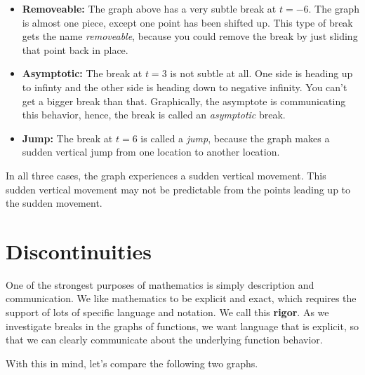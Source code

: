 \documentclass{ximera}
\begin{document}
\begin{itemize}
\item \textbf{\textcolor{blue!75!black}{Removeable:}}  The graph above has a very subtle break at $t=-6$. The graph is almost one piece, except one point has been shifted up. This type of break gets the name \textit{removeable}, because you could remove the break by just sliding that point back in place. \\

\item \textbf{\textcolor{blue!75!black}{Asymptotic:}} The break at $t=3$ is not subtle at all.  One side is heading up to infinty and the other side is heading down to negative infinity.  You can't get a bigger break than that. Graphically, the asymptote is communicating this behavior, hence, the break is called an \textit{asymptotic} break. \\

\item \textbf{\textcolor{blue!75!black}{Jump:}} The break at $t=6$ is called a \textit{jump}, because the graph makes a sudden vertical jump from one location to another location.
\end{itemize}


In all three cases, the graph experiences a sudden vertical movement.  This sudden vertical movement may not be predictable from the points leading up to the sudden movement.








\section{Discontinuities}
One of the strongest purposes of mathematics is simply description and communication.  We like mathematics to be explicit and exact, which requires the support of lots of specific language and notation. We call this \textbf{\textcolor{purple!85!blue}{rigor}}. As we investigate breaks in the graphs of functions, we want language that is explicit, so that we can clearly communicate about the underlying function behavior.

With this in mind, let's compare the following two graphs.
\end{document}

